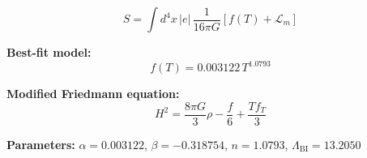 
\begin{equation}
  S = \int d^4x \, |e| \, \frac{1}{16\pi G} \left[ f(T) + \mathcal{L}_m \right]
\end{equation}

\textbf{Best-fit model:}
\begin{equation}
  f(T) = 0.003122 \, T^{1.0793}
\end{equation}

\textbf{Modified Friedmann equation:}
\begin{equation}
  H^2 = \frac{8\pi G}{3} \rho - \frac{f}{6} + \frac{T f_T}{3}
\end{equation}

\textbf{Parameters:}
$\alpha = 0.003122$, \quad
$\beta = -0.318754$, \quad
$n = 1.0793$, \quad
$\Lambda_{\text{BI}} = 13.2050$